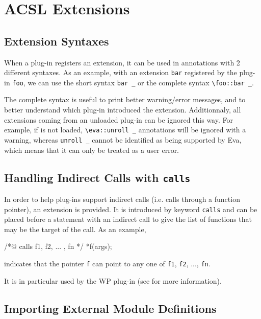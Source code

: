\chapter{ACSL Extensions} %
\label{cha:acsl-extensions}
\section{Extension Syntaxes}
\label{acsl:syntax}

When a plug-in registers an extension, it can be used in \acsl annotations
with 2 different syntaxes. As an example, with an extension \lstinline|bar|
registered by the plug-in \lstinline|foo|, we can use the short syntax
\lstinline|bar _| or the complete syntax \lstinline|\foo::bar _|.

The complete syntax is useful to print better warning/error messages, and to
better understand which plug-in introduced the extension. Additionnaly, all
extensions coming from an unloaded plug-in can be ignored this way. For
example, if \Eva is not loaded, \lstinline|\eva::unroll _| annotations will be
ignored with a warning, whereas \lstinline|unroll _| cannot be identified as
being supported by Eva, which means that it can only be treated as a user
error.

\section{Handling Indirect Calls with \texttt{calls}}
\label{acsl:calls}

In order to help plug-ins support indirect calls (i.e. calls through
a function pointer), an \acsl extension is provided. It is introduced
by keyword \lstinline|calls| and can be placed before
a statement with an indirect call to give the list of
functions that may be the target of the call. As an example,
\begin{ccode}
/*@ calls f1, f2, ... , fn */
*f(args);
\end{ccode}
indicates that the pointer \lstinline|f| can point to any one of
\lstinline|f1|, \lstinline|f2|, ..., \lstinline|fn|.

It is in particular used by the WP plug-in (see \cite{wp} for more information).

\section{Importing External Module Definitions}
\label{acsl:modules}


